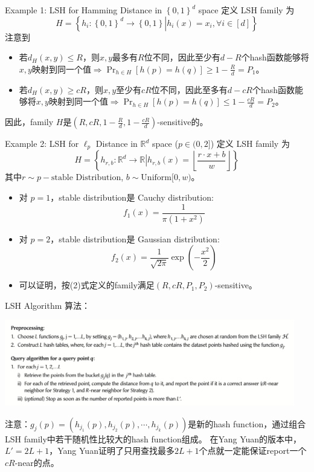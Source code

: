\begin{frame}{Example 1: LSH for Hamming Distance in $\left\{ 0, 1 \right\}^{d} $ space}
    定义 LSH family 为 
        \[
            H = \left\{ h_i : \left. \left\{ 0, 1 \right\} ^{d} \to \left\{ 0, 1 \right\} \right| h_i(x) = x_i, \forall i \in [d] \right\} 
        \]
        注意到
    \begin{itemize}
        \item 若$d_H(x, y) \leqslant R$，则$x, y$最多有$R$位不同，因此至少有$d-R$个hash函数能够将$x, y$映射到同一个值$\Rightarrow \Pr_{h \in H}[h(p) = h(q)] \geq 1-\frac{R}{d} = P_1$。
        \item 若$d_H(x, y) \geqslant cR$，则$x, y$至少有$cR$位不同，因此至多有$d-cR$个hash函数能够将$x, y$映射到同一个值$\Rightarrow \Pr_{h \in H}[h(p) = h(q)] \leq 1- \frac{cR}{d} = P_2$。
    \end{itemize}
    因此，family $H$是$(R, cR, 1-\frac{R}{d}, 1-\frac{cR}{d})$-sensitive的。
    
\end{frame}

\begin{frame}{Example 2: LSH for $\ell_p$ Distance in $\mathbb{R}^{d} $ space ($p \in (0, 2]$)}
    定义 LSH family 为 
        \[
            H = \left\{ h_{r, b} : \left. \mathbb{R}^{d} \to \mathbb{R} \right| h_{r, b}(x) = \left\lfloor \frac{r \cdot x + b}{w} \right\rfloor \right\}\tag{2}
        \]
        其中$r \sim p-\text{stable Distribution}$, $b \sim \text{Uniform}[0, w)$。

    \begin{itemize}
        \item 对 $p=1$，stable distribution是 Cauchy distribution:
        \[
            f_1(x) = \frac{1}{\pi(1+x^2)}
        \]
        \item 对 $p=2$，stable distribution是 Gaussian distribution:
        \[
            f_2(x) = \frac{1}{\sqrt{2\pi}} \exp(-\frac{x^2}{2})
        \]
        \item 可以证明，按(2)式定义的family满足$(R, cR, P_1, P_2)$-sensitive。
    \end{itemize}
    
\end{frame}

\begin{frame}{LSH Algorithm}
    算法：
    \begin{center}
        \includegraphics[width=0.95\textwidth]{assets/lsh.png}
    \end{center}
    注意：$g_j(p) = (h_{j_1}(p), h_{j_2}(p), \cdots, h_{j_k}(p))$是新的hash function，通过组合LSH family中若干随机性比较大的hash function组成。
    在Yang Yuan的版本中，$L' = 2L+1$，Yang Yuan证明了只用查找最多$2L+1$个点就一定能保证report一个$cR$-near的点。
\end{frame}

